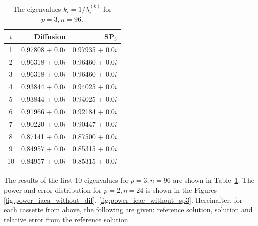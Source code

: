 \documentclass[authoryear]{elsarticle}
\begin{document}
\begin{table}[h]
\caption{The eigenvalues $k_i=1/\lambda_i^{(k)}$ for $p=3, n=96$.}
\label{tab:iaea_without_lambda_10}
\begin{center}
\begin{tabular}{c r r}
\hline
$i$ & Diffusion & SP$_3$  \\
\hline
1 & 0.97808 + 0.0$i$ & 0.97935 + 0.0$i$\\
2 & 0.96318 + 0.0$i$ & 0.96460 + 0.0$i$\\
3 & 0.96318 + 0.0$i$ & 0.96460 + 0.0$i$\\
4 & 0.93844 + 0.0$i$ & 0.94025 + 0.0$i$\\
5 & 0.93844 + 0.0$i$ & 0.94025 + 0.0$i$\\
6 & 0.91966 + 0.0$i$ & 0.92184 + 0.0$i$\\
7 & 0.90220 + 0.0$i$ & 0.90447 + 0.0$i$\\
8 & 0.87141 + 0.0$i$ & 0.87500 + 0.0$i$\\
9 & 0.84957 + 0.0$i$ & 0.85315 + 0.0$i$\\
10 & 0.84957 + 0.0$i$ & 0.85315 + 0.0$i$\\
\hline
\end{tabular}
\end{center}
\end{table}

The results of the first 10 eigenvalues for $ p = 3, n = 96 $ are shown in Table~\ref{tab:iaea_without_lambda_10}.
The power and error distribution for $p = 2, n = 24$ is shown in the Figures \ref{fig:power_iaea_without_dif}, \ref{fig:power_ieae_without_sp3}.
Hereinafter, for each cassette from above, the following are given: reference solution, solution and relative error from the reference solution.
\end{document}
